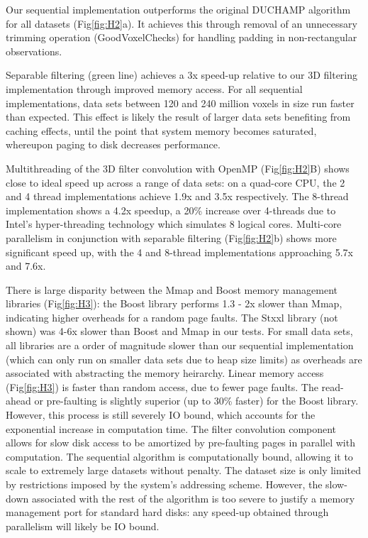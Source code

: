 Our sequential implementation outperforms the original DUCHAMP algorithm for all datasets (Fig\ref{fig:H2}a).  It achieves this through removal of an unnecessary  trimming operation (GoodVoxelChecks) for handling padding in non-rectangular observations.  

Separable filtering (green line) achieves a 3x speed-up relative to our 3D filtering implementation  through improved memory access. For all sequential implementations, data sets between  120 and 240 million voxels in size run faster than expected. This effect is likely the result of larger data sets benefiting from caching effects, until  the point that system memory becomes saturated, whereupon paging to disk decreases performance.

Multithreading  of the 3D filter convolution  with OpenMP (Fig\ref{fig:H2}B) shows close to ideal speed up across a range of data sets: on a quad-core CPU, the 2 and 4 thread implementations achieve 1.9x and 3.5x respectively.  The 8-thread implementation shows a 4.2x speedup, a 20\% increase over 4-threads due to  Intel's hyper-threading technology which simulates 8 logical cores. Multi-core parallelism in conjunction with separable filtering (Fig\ref{fig:H2}b) shows more significant speed up, with the 4 and 8-thread implementations approaching 5.7x and 7.6x. 

There is large disparity between the Mmap and Boost memory management libraries (Fig\ref{fig:H3}): the Boost library performs  1.3 - 2x slower than Mmap, indicating higher overheads for a random page faults.   The Stxxl library (not shown) was 4-6x slower than Boost and Mmap in our tests. For small data sets, all libraries are a order of magnitude slower than our sequential implementation (which can only run on smaller data sets due to heap size limits) as overheads are associated with abstracting the memory heirarchy. Linear memory access (Fig\ref{fig:H3}) is faster than random access, due to fewer page faults. The read-ahead or pre-faulting is slightly superior (up to 30\% faster) for the Boost library. However, this process is still severely IO bound,  which accounts for the exponential increase in computation time. The filter convolution component allows for slow disk access to be amortized by pre-faulting pages in parallel with computation. The sequential algorithm is  computationally bound, allowing it to scale to extremely large datasets without penalty. The dataset size is only limited by restrictions imposed by the system's addressing scheme. However, the slow-down associated with the rest of the algorithm is too severe to justify a memory management port for standard hard disks: any speed-up obtained through parallelism will likely be IO bound.

